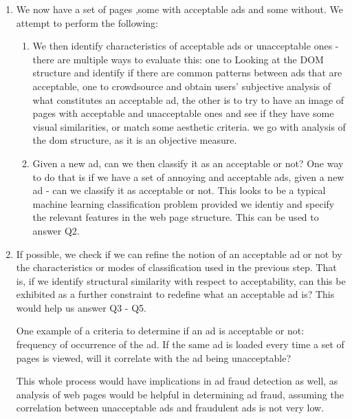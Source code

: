 \begin{enumerate}
\item We now have a set of pages ,some with acceptable ads and some without. We attempt to perform the following:
 \begin{enumerate}
 \item We then identify characteristics of acceptable ads or unacceptable ones - there are multiple ways to evaluate this: one to Looking at the DOM structure and identify if there are common patterns between ads that are acceptable, one to crowdsource and obtain users' subjective analysis of what constitutes an acceptable ad, the other is to try to have an image of pages with acceptable and unacceptable ones and see if they have some visual similarities, or match some aesthetic criteria. we go with analysis of the dom structure, as it is an objective measure.
 \item Given a new ad, can we then classify it as an acceptable or not? One way to do that is if we have a set of annoying and acceptable ads, given a new ad - can we classify it as acceptable or not. This looks to be a typical machine learning classification problem provided we identiy and specify the relevant features in the web page structure. This can be used to answer Q2.
 \end{enumerate}

 \item If possible, we check if we can refine the notion of an acceptable ad or not by the characteristics or modes of classification used in the previous step. That is, if we identify structural similarity with respect to acceptability, can this be exhibited as a further constraint to redefine what an acceptable ad is? This would help us answer Q3 - Q5.

 One example of a criteria to determine if an ad is acceptable or not: frequency of occurrence of the ad. If the same ad is loaded every time a set of pages is viewed, will it correlate with the ad being unacceptable?

 This whole process would have implications in ad fraud detection as well, as analysis of web pages would be helpful in determining ad fraud, assuming the correlation between unacceptable ads and fraudulent ads is not very low.
\end{enumerate}
